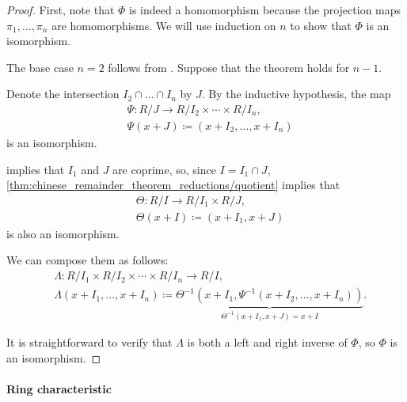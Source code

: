 \begin{proof}
  First, note that \( \Phi \) is indeed a homomorphism because the projection maps \( \pi_1, \ldots, \pi_n \) are homomorphisms. We will use induction on \( n \) to show that \( \Phi \) is an isomorphism.

  The base case \( n = 2 \) follows from . Suppose that the theorem holds for \( n - 1 \).

  Denote the intersection \( I_2 \cap \ldots \cap I_n \) by \( J \). By the inductive hypothesis, the map
  \begin{equation*}
    \begin{aligned}
      &\Psi: R / J \to R / I_2 \times \cdots \times R / I_n, \\
      &\Psi(x + J) \coloneqq (x + I_2, \ldots, x + I_n)
    \end{aligned}
  \end{equation*}
  is an isomorphism.

   implies that \( I_1 \) and \( J \) are coprime, so, since \( I = I_1 \cap J \), \cref{thm:chinese_remainder_theorem_reductions/quotient} implies that
  \begin{equation*}
    \begin{aligned}
      &\Theta: R / I \to R / I_1 \times R / J, \\
      &\Theta(x + I) \coloneqq (x + I_1, x + J)
    \end{aligned}
  \end{equation*}
  is also an isomorphism.

  We can compose them as follows:
  \begin{equation*}
    \begin{aligned}
      &\Lambda: R / I_1 \times R / I_2 \times \cdots \times R / I_n \to R / I, \\
      &\Lambda(x + I_1, \ldots, x + I_n) \coloneqq \underbrace{\Theta^{-1}(x + I_1, \Psi^{-1}(x + I_2, \ldots, x + I_n))}_{\Theta^{-1}(x + I_1, x + J) = x + I}.
    \end{aligned}
  \end{equation*}

  It is straightforward to verify that \( \Lambda \) is both a left and right inverse of \( \Phi \), so \( \Phi \) is an isomorphism.
\end{proof}

\paragraph{Ring characteristic}


